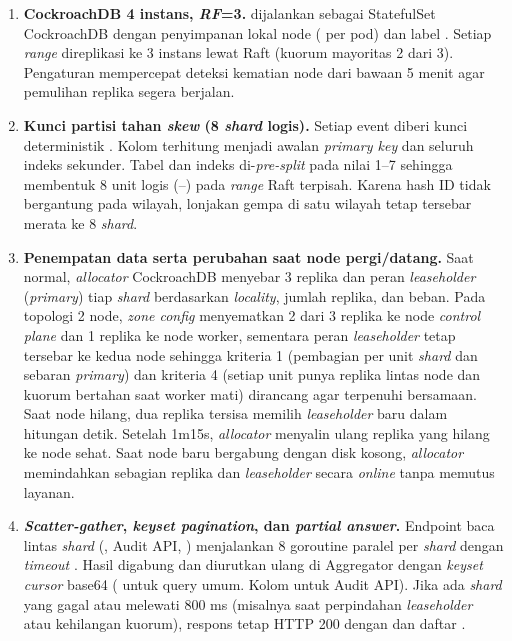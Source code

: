 \begin{enumerate}
\item \textbf{CockroachDB 4 instans, \textit{RF}=3.}  dijalankan sebagai StatefulSet CockroachDB  dengan penyimpanan lokal node ( per pod) dan label . Setiap \textit{range} direplikasi ke 3 instans lewat Raft (kuorum mayoritas 2 dari 3). Pengaturan  mempercepat deteksi kematian node dari bawaan 5 menit agar pemulihan replika segera berjalan.
\item \textbf{Kunci partisi tahan \textit{skew} (8 \textit{shard} logis).} Setiap event diberi kunci deterministik . Kolom terhitung  menjadi awalan \textit{primary key}  dan seluruh indeks sekunder. Tabel dan indeks di-\textit{pre-split} pada nilai 1--7 sehingga membentuk 8 unit logis (--) pada \textit{range} Raft terpisah. Karena hash ID tidak bergantung pada wilayah, lonjakan gempa di satu wilayah tetap tersebar merata ke 8 \textit{shard}.
\item \textbf{Penempatan data serta perubahan saat node pergi/datang.} Saat normal, \textit{allocator} CockroachDB menyebar 3 replika dan peran \textit{leaseholder} (\textit{primary}) tiap \textit{shard} berdasarkan \textit{locality}, jumlah replika, dan beban. Pada topologi 2 node, \textit{zone config} menyematkan 2 dari 3 replika ke node \textit{control plane} dan 1 replika ke node worker, sementara peran \textit{leaseholder} tetap tersebar ke kedua node sehingga kriteria 1 (pembagian per unit \textit{shard} dan sebaran \textit{primary}) dan kriteria 4 (setiap unit punya replika lintas node dan kuorum bertahan saat worker mati) dirancang agar terpenuhi bersamaan. Saat node hilang, dua replika tersisa memilih \textit{leaseholder} baru dalam hitungan detik. Setelah 1m15s, \textit{allocator} menyalin ulang replika yang hilang ke node sehat. Saat node baru bergabung dengan disk kosong, \textit{allocator} memindahkan sebagian replika dan \textit{leaseholder} secara \textit{online} tanpa memutus layanan.
\item \textbf{\textit{Scatter-gather}, \textit{keyset pagination}, dan \textit{partial answer}.} Endpoint baca lintas \textit{shard} (, Audit API, ) menjalankan 8 goroutine paralel per \textit{shard} dengan \textit{timeout} . Hasil digabung dan diurutkan ulang di Aggregator dengan \textit{keyset cursor} base64 ( untuk query umum. Kolom  untuk Audit API). Jika ada \textit{shard} yang gagal atau melewati 800 ms (misalnya saat perpindahan \textit{leaseholder} atau kehilangan kuorum), respons tetap HTTP 200 dengan  dan daftar .

\end{enumerate}
